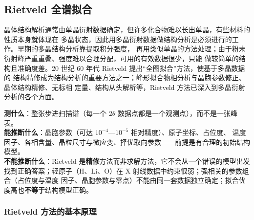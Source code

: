 \subsection{Rietveld 全谱拟合}

晶体结构解析通常由单晶衍射数据确定，但许多化合物难以长出单晶，有些材料的性质本身就体现在
多晶状态，因此用多晶衍射数据做结构分析是必须进行的工作。早期的多晶结构分析靠提取积分强度，
再用类似单晶的方法处理；由于粉末衍射峰严重重叠、强度难以合理分配，可用的有效数据很少，只能
做较简单的结构且准确度差。20 世纪 60 年代 Rietveld 提出``全图拟合''方法，使基于多晶数据的
结构精修成为结构分析的重要方法之一；峰形拟合物相分析与晶胞参数修正、晶体结构精修、无标相
定量、结构从头解析等，Rietveld 方法已深入到多晶衍射分析的各个方面。

\begin{probout}
\textbf{测什么}：整张步进扫描谱（每一个 $2\theta$ 数据点都是一个观测点），而不是一张峰表。\\
\textbf{能推断什么}：晶胞参数（可达 $10^{-4}$—$10^{-5}$ 相对精度）、原子坐标、占位度、
温度因子、各相含量、晶粒尺寸与微应变、择优取向参数——前提是有合理的初始结构模型。\\
\textbf{不能推断什么}：Rietveld 是\textbf{精修}方法而非求解方法，它不会从一个错误的模型出发
找到正确答案；轻原子（H、Li、O）在 X 射线数据中约束很弱；强相关的参数组合（占位度与温度
因子、晶胞参数与零点）不能由同一套数据独立确定；拟合优度高也\textbf{不等于}结构模型正确。
\end{probout}

\subsubsection{Rietveld 方法的基本原理}

